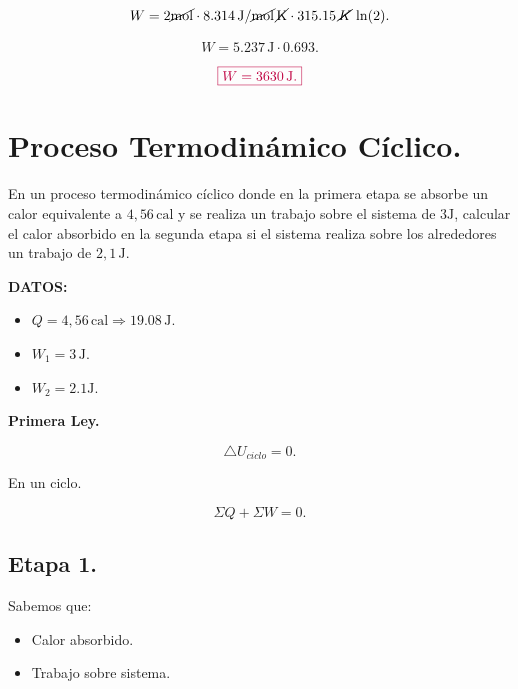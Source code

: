 \documentclass[a4paper,12pt]{article} %
\begin{document}
\[ W = 2 \cancel{\mathrm{mol}} \cdot 8.314 \, \mathrm{J}/ \cancel{\mathrm{mol}} \, \cancel{\mathrm{K}} \cdot 315.15 \, \cancel{K} \, \ln(2). \]

\[ W = 5.237 \, \mathrm{J}  \cdot 0.693. \]

\[ \textcolor{purple}{\boxed{ W = 3630 \, \mathrm{J}. }} \]

\section{Proceso Termodinámico Cíclico.}

\begin{justify}
	En un proceso termodinámico cíclico donde en la primera etapa se absorbe un calor equivalente a \( 4,56 \, \mathrm{cal} \) y se realiza un trabajo sobre el sistema de \(3 \mathrm{J} \), calcular el calor absorbido en la segunda etapa si el sistema realiza sobre los alrededores un trabajo de \( 2,1 \, \mathrm{J} \).
\end{justify}

\begin{justify}
	\textbf{DATOS:}
\end{justify}

\begin{itemize}
	\item \( Q = 4,56 \, \mathrm{cal} \Rightarrow 19.08 \, \mathrm{J}. \)
	\item \( W_1 = 3 \, \mathrm{J}. \)
	\item \( W_2 = 2.1 \mathrm{J}. \)
\end{itemize}

\begin{justify}
	\textbf{Primera Ley.}
\end{justify}

\[ \triangle U_{ciclo} = 0 .\]

\begin{justify}
	En un ciclo.
\end{justify}

\[ \Sigma Q + \Sigma W = 0. \]

\subsection{Etapa 1.}

\begin{justify}
	Sabemos que:
\end{justify}

\begin{itemize}
	\item Calor absorbido.
	\item Trabajo sobre sistema.
\end{itemize}
\end{document}
